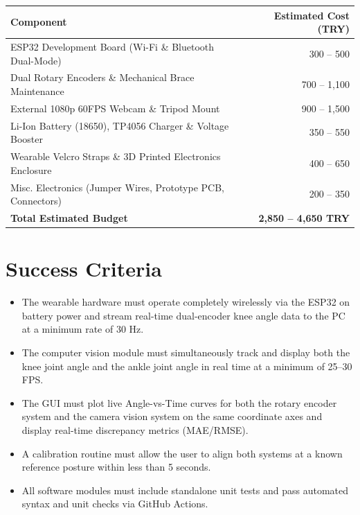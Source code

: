 \documentclass[11pt, a4paper]{article}
\begin{document}
\begin{table}[h!]
\centering
\renewcommand{\arraystretch}{1.25}
\begin{tabularx}{0.75\textwidth}{X r}
\toprule
\rowcolor{lightgray} \textbf{Component} & \textbf{Estimated Cost (TRY)} \\
\midrule
ESP32 Development Board (Wi-Fi \& Bluetooth Dual-Mode) & 300 -- 500 \\
Dual Rotary Encoders \& Mechanical Brace Maintenance & 700 -- 1,100 \\
External 1080p 60FPS Webcam \& Tripod Mount & 900 -- 1,500 \\
Li-Ion Battery (18650), TP4056 Charger \& Voltage Booster & 350 -- 550 \\
Wearable Velcro Straps \& 3D Printed Electronics Enclosure & 400 -- 650 \\
Misc. Electronics (Jumper Wires, Prototype PCB, Connectors) & 200 -- 350 \\
\midrule
\textbf{Total Estimated Budget} & \textbf{2,850 -- 4,650 TRY} \\
\bottomrule
\end{tabularx}
\end{table}

\section{Success Criteria}
\begin{itemize}[leftmargin=1.5em, itemsep=0.35em]
    \item The wearable hardware must operate completely wirelessly via the ESP32 on battery power and stream real-time dual-encoder knee angle data to the PC at a minimum rate of 30 Hz.
    \item The computer vision module must simultaneously track and display both the knee joint angle and the ankle joint angle in real time at a minimum of 25--30 FPS.
    \item The GUI must plot live Angle-vs-Time curves for both the rotary encoder system and the camera vision system on the same coordinate axes and display real-time discrepancy metrics (MAE/RMSE).
    \item A calibration routine must allow the user to align both systems at a known reference posture within less than 5 seconds.
    \item All software modules must include standalone unit tests and pass automated syntax and unit checks via GitHub Actions.
\end{itemize}
\end{document}
